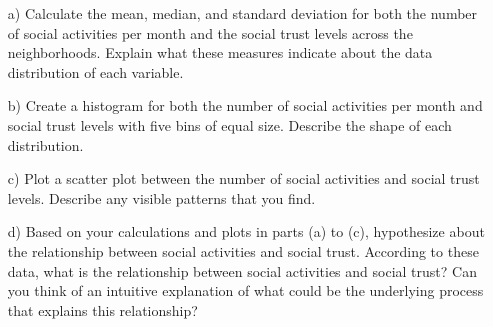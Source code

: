 \documentclass{article}
\begin{document}
\begin{enumerate}
    \item[a)] Calculate the mean, median, and standard deviation for both the number of social activities per month and the social trust levels across the neighborhoods. Explain what these measures indicate about the data distribution of each variable.
    \item[b)] Create a histogram for both the number of social activities per month and social trust levels with five bins of equal size. Describe the shape of each distribution.
    \item[c)] Plot a scatter plot between the number of social activities and social trust levels. Describe any visible patterns that you find.
    \item[d)] Based on your calculations and plots in parts (a) to (c), hypothesize about the relationship between social activities and social trust. According to these data, what is the relationship between social activities and social trust? Can you think of an intuitive explanation of what could be the underlying process that explains this relationship?
\end{enumerate}

\newpage
\end{document}
